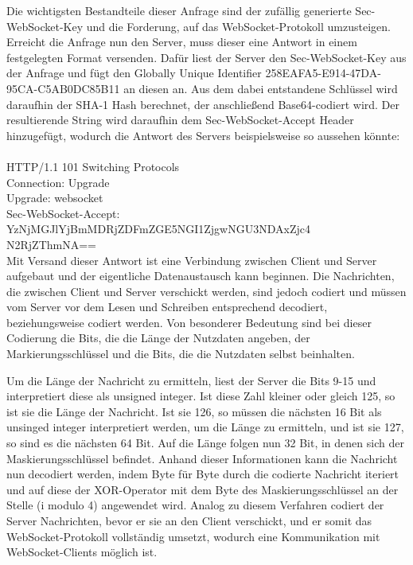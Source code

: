 \documentclass[12pt, onecolumn, notitlepage]{scrartcl}
\begin{document}
Die wichtigsten Bestandteile dieser Anfrage sind der zufällig generierte Sec-WebSocket-Key und die Forderung, auf das WebSocket-Protokoll umzusteigen. Erreicht die Anfrage nun den Server, muss dieser eine Antwort in einem festgelegten Format versenden. Dafür liest der Server den Sec-WebSocket-Key aus der Anfrage und fügt den Globally Unique Identifier 258EAFA5-E914-47DA-95CA-C5AB0DC85B11 an diesen an. Aus dem dabei entstandene Schlüssel wird daraufhin der SHA-1 Hash berechnet, der anschließend Base64-codiert wird.  Der resultierende String wird daraufhin dem Sec-WebSocket-Accept Header hinzugefügt, wodurch die Antwort des Servers beispielsweise so aussehen könnte: \\ \\
HTTP/1.1 101 Switching Protocols \\
Connection: Upgrade \\
Upgrade: websocket \\
Sec-WebSocket-Accept: YzNjMGJlYjBmMDRjZDFmZGE5NGI1ZjgwNGU3NDAxZjc4\\N2RjZThmNA== \\

Mit Versand dieser Antwort ist eine Verbindung zwischen Client und Server aufgebaut und der eigentliche Datenaustausch kann beginnen. Die Nachrichten, die zwischen Client und Server verschickt werden, sind jedoch codiert und müssen vom Server vor dem Lesen und Schreiben entsprechend decodiert, beziehungsweise codiert werden. Von besonderer Bedeutung sind bei dieser Codierung die Bits, die die Länge der Nutzdaten angeben, der Markierungsschlüssel und die Bits, die die Nutzdaten selbst beinhalten. \par
Um die Länge der Nachricht zu ermitteln, liest der Server die Bits 9-15 und interpretiert diese als unsigned integer. Ist diese Zahl kleiner oder gleich 125, so ist sie die Länge der Nachricht. Ist sie 126, so müssen die nächsten 16 Bit als unsinged integer interpretiert werden, um die Länge zu ermitteln, und ist sie 127, so sind es die nächsten 64 Bit. Auf die Länge folgen nun 32 Bit, in denen sich der Maskierungsschlüssel befindet. Anhand dieser Informationen kann die Nachricht nun decodiert werden, indem Byte für Byte durch die codierte Nachricht iteriert und auf diese der XOR-Operator mit dem  Byte des Maskierungsschlüssel an der Stelle (i modulo 4) angewendet wird.  Analog zu diesem Verfahren codiert der Server Nachrichten, bevor er sie an den Client verschickt, und er somit das WebSocket-Protokoll vollständig umsetzt, wodurch eine Kommunikation mit WebSocket-Clients möglich ist.\\
\end{document}
